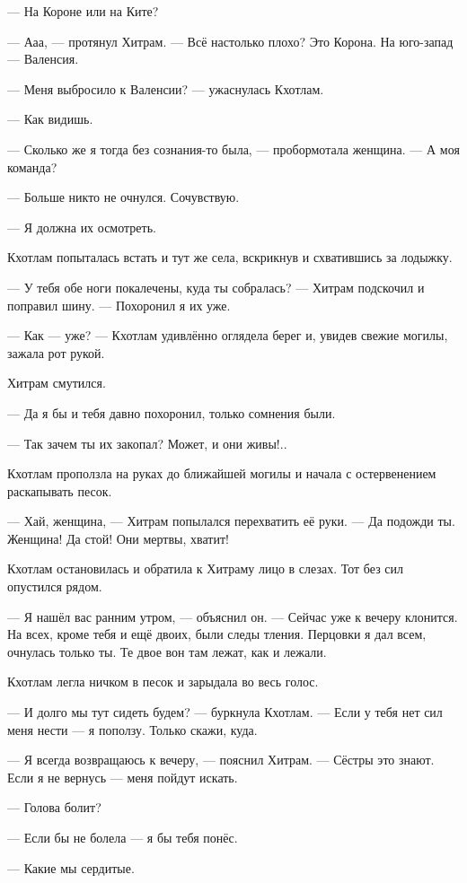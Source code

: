 --- На Короне или на Ките?

--- Ааа, --- протянул Хитрам.
--- Всё настолько плохо?
Это Корона.
На юго-запад --- Валенсия.

--- Меня выбросило к Валенсии? --- ужаснулась Кхотлам.

--- Как видишь.

--- Сколько же я тогда без сознания-то была, --- пробормотала женщина.
--- А моя команда?

--- Больше никто не очнулся.
Сочувствую.

--- Я должна их осмотреть.

Кхотлам попыталась встать и тут же села, вскрикнув и схватившись за лодыжку.

--- У тебя обе ноги покалечены, куда ты собралась? --- Хитрам подскочил и поправил шину.
--- Похоронил я их уже.

--- Как --- уже? --- Кхотлам удивлённо оглядела берег и, увидев свежие могилы, зажала рот рукой.

Хитрам смутился.

--- Да я бы и тебя давно похоронил, только сомнения были.

--- Так зачем ты их закопал?
Может, и они живы!..

Кхотлам проползла на руках до ближайшей могилы и начала с остервенением раскапывать песок.

--- Хай, женщина, --- Хитрам попылался перехватить её руки.
--- Да подожди ты.
Женщина!
Да стой!
Они мертвы, хватит!

Кхотлам остановилась и обратила к Хитраму лицо в слезах.
Тот без сил опустился рядом.

--- Я нашёл вас ранним утром, --- объяснил он.
--- Сейчас уже к вечеру клонится.
На всех, кроме тебя и ещё двоих, были следы тления.
Перцовки я дал всем, очнулась только ты.
Те двое вон там лежат, как и лежали.

Кхотлам легла ничком в песок и зарыдала во весь голос.

\asterism

--- И долго мы тут сидеть будем? --- буркнула Кхотлам.
--- Если у тебя нет сил меня нести --- я поползу.
Только скажи, куда.

--- Я всегда возвращаюсь к вечеру, --- пояснил Хитрам.
--- Сёстры это знают.
Если я не вернусь --- меня пойдут искать.

--- Голова болит?

--- Если бы не болела --- я бы тебя понёс.

--- Какие мы сердитые.

